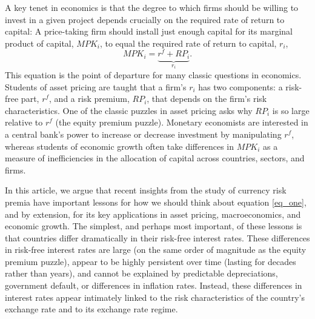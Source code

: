 \documentclass{ar-1col}
\begin{document}
A key tenet in economics is that the degree to which firms should be willing to invest in a given project depends crucially on the required rate of return to capital: A price-taking firm should install just enough capital for its marginal product of capital, $MPK_i$, to equal the required rate of return to capital, $r_i$,
\begin{equation}
  MPK_i=\underbrace{r^f+RP_i}_{r_i}.
  \label{eq_one}
\end{equation} 
This equation is the point of departure for many classic questions in economics. Students of asset pricing are taught that a firm's $r_i$ has two components: a risk-free part, $r^f$, and a risk premium, $RP_i$, that depends on the firm's risk characteristics. One of the classic puzzles in asset pricing asks why $RP_i$ is so large relative to $r^f$ (the equity premium puzzle). Monetary economists are interested in a central bank's power to increase or decrease investment by manipulating $r^f$, whereas students of economic growth often take differences in $MPK_i$ as a measure of inefficiencies in the allocation of capital across countries, sectors, and firms.

In this article, we argue that recent insights from the study of currency risk premia have important lessons for how we should think about equation \ref{eq_one}, and by extension, for its key applications in asset pricing, macroeconomics, and economic growth. The simplest, and perhaps most important, of these lessons is that countries differ dramatically in their risk-free interest rates. These differences in risk-free interest rates are large (on the same order of magnitude as the equity premium puzzle), appear to be highly persistent over time (lasting for decades rather than years), and cannot be explained by predictable depreciations, government default, or differences in inflation rates. Instead, these differences in interest rates appear intimately linked to the risk characteristics of the country's exchange rate and to its exchange rate regime.
\end{document}
